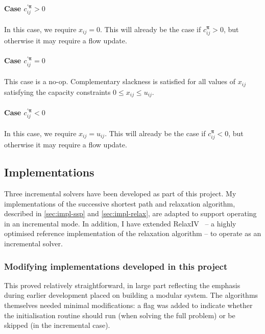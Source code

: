\paragraph{Case $c_{ij}^{\prime\boldsymbol{\pi}} > 0$}
In this case, we require $x_{ij} = 0$. This will already be the case if $c_{ij}^{\boldsymbol{\pi}} > 0$, but otherwise it may require a flow update.

\paragraph{Case $c_{ij}^{\prime\boldsymbol{\pi}} = 0$}
This case is a no-op. Complementary slackness is satisfied for all values of $x_{ij}$ satisfying the capacity constraints $0 \leq x_{ij} \leq u_{ij}$.

\paragraph{Case $c_{ij}^{\prime\boldsymbol{\pi}} < 0$}
In this case, we require $x_{ij} = u_{ij}$. This will already be the case if $c_{ij}^{\boldsymbol{\pi}} < 0$, but otherwise it may require a flow update.

\subsection{Implementations} \label{sec:impl-incremental-impl}

Three incremental solvers have been developed as part of this project. My implementations of the successive shortest path and relaxation algorithm, described in \cref{sec:impl-ssp} and \cref{sec:impl-relax}, are adapted to support operating in an incremental mode. In addition, I have extended RelaxIV~\cite{BertsekasCodes:1988,RelaxIV:2011} -- a highly optimised reference implementation of the relaxation algorithm -- to operate as an incremental solver. 

\subsubsection{Modifying implementations developed in this project}
This proved relatively straightforward, in large part reflecting the emphasis during earlier development placed on building a modular system. The algorithms themselves needed minimal modifications: a flag was added to indicate whether the initialisation routine should run (when solving the full problem) or be skipped (in the incremental case). 

